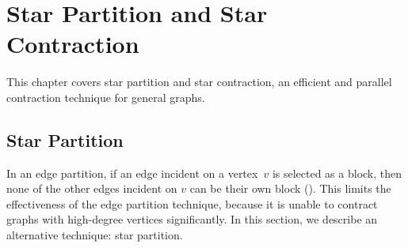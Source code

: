 \chapter{Star Partition and Star Contraction}
\label{ch:graphcon::star}

\begin{preamble}
This chapter covers star partition and star contraction, an
efficient and parallel contraction technique for general graphs. 
\end{preamble}

\section{Star Partition}
\label{sec:graphcon::star::partition}

\begin{gram}
In an edge partition, if an edge incident on a vertex~$v$ is selected
as a block, then none of the other edges incident on $v$ can be their
own block (). 
%
This limits the effectiveness of the edge partition technique, because
it is unable to contract graphs with high-degree vertices
significantly.
%
In this section, we describe an alternative technique: star partition.
\end{gram}

